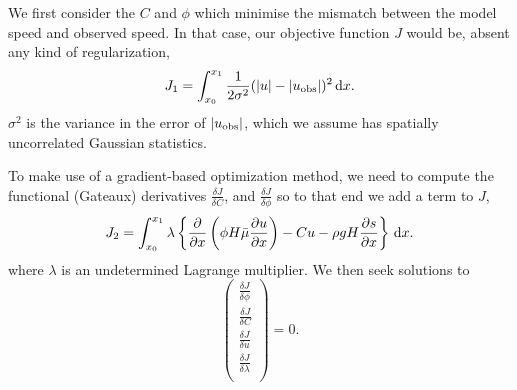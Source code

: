 \documentclass{article}
\begin{document}
We first consider the $C$ and $\phi$ which minimise the mismatch between the model speed and observed speed.
In that case, our objective function $J$ would be, absent any kind of regularization, 
\begin{equation}
J_{\rm 1} = \int _{x_0} ^{x_1} \frac{1}{2\sigma^2}(|u| - |u_{\rm obs}|)^2 \,{\rm d}x .
\end{equation}
$\sigma^2$ is the variance in the error of $|u_{\rm obs}|$, which we assume has spatially uncorrelated Gaussian statistics.

To make use of a gradient-based optimization method, we need to compute
the functional (Gateaux) derivatives $\frac{\delta J}{\delta C}$, and $\frac{\delta J}{\delta \phi}$ so to that end we add a term to $J$,
\begin{equation}
J_{\rm 2} =  \int _{x_0} ^{x_1} \lambda \left \{ \frac{\partial}{\partial x} \left ( \phi H \bar{\mu}  \frac{\partial u}{\partial x} \right ) - Cu - \rho g H \frac{\partial s}{\partial x} \right\} \,{\rm d}x .
\end{equation}
where $\lambda$ is an undetermined Lagrange multiplier. We then seek solutions to 
\begin{equation}
\label{eq::gradJaug}
\left ( \begin{array}{l}
\frac{\delta J}{\delta \phi} \\
\frac{\delta J}{\delta C} \\
\frac{\delta J}{\delta u } \\
\frac{\delta J}{\delta \lambda} \\
\end{array} \right ) = 0.
\end{equation}
\end{document}
